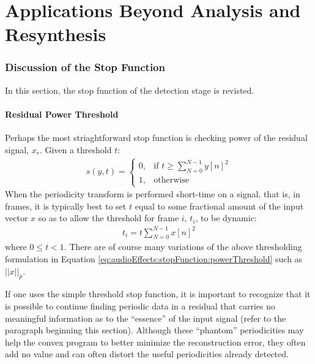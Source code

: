 \chapter{Applications Beyond Analysis and Resynthesis}



\subsection{Discussion of the Stop Function}\label{section:audioEffects:stopFunction}
In this section, the stop function of the detection stage is revisted.

    \subsubsection{Residual Power Threshold}
    Perhaps the most striaghtforward stop function is checking power of the residual signal, $x_r$. Given a threshold $t$:
    \begin{align}\label{eq:audioEffects:stopFunction:powerThreshold}
        s(y, t) =
            \begin{cases}
                0, & \text{if } t \geq \sum_{N = 0}^{N-1} y[n]^2 \\
                1, & \text{otherwise}
            \end{cases}
    \end{align}
    When the periodicity transform is performed short-time on a signal, that is, in frames, it is typically best to set $t$ equal to some fractional amount of the input vector $x$ so as to allow the threshold for frame $i$, $t_i$, to be dynamic:
    \begin{align*}
        t_i = t \sum_{N = 0}^{N-1} x[n]^2
    \end{align*}
    where $0 \leq t < 1$. There are of course many variations of the above thresholding formulation in Equation \eqref{eq:audioEffects:stopFunction:powerThreshold} such as $||x||_p$.

    If one uses the simple threshold stop function, it is important to recognize that it is possible to continue finding periodic data in a residual that carries no meaningful information as to the ``essence'' of the input signal (refer to the paragraph beginning this section). Although these ``phantom'' periodicities may help the convex program to better minimize the reconstruction error, they often add no value and can often distort the useful periodicities already detected.

